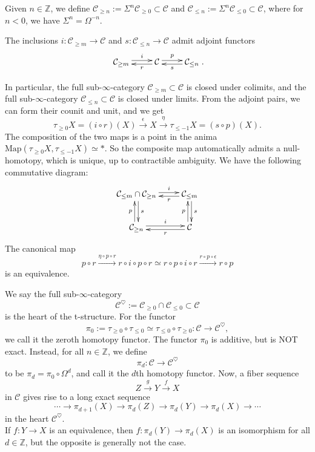\documentclass[UTF8,12,a4paper]{ctexart}
\theoremstyle{definition}
\begin{document}
Given $n\in \mathbb{Z}$, we define $\mathcal{C}_{\geq n}:= \Sigma^n \mathcal{C}_{\geq0}\subset \mathcal{C}$ and $\mathcal{C}_{\leq n}:=\Sigma^n \mathcal{C}_{\leq0}\subset \mathcal{C}$, where for $n<0$, we have $\Sigma^n=\Omega^{-n}.$

The inclusions $i:\mathcal{C}_{\geq m}\rightarrow \mathcal{C}$ and $s:\mathcal{C}_{\leq n}\rightarrow \mathcal{C}$ admit adjoint functors
$$
\xymatrix{\mathcal{C}_{\geq m} \ar@<0.5ex>[r]^-i
	&\mathcal{C}\ar@<0.5ex>[l]^-{r}
	 \ar@<0.5ex>[r]^-{p}
	& \mathcal{C}_{\leq n}\ar@<0.5ex>[l]^-s }.
$$





In particular, the full sub-$\infty$-category $\mathcal{C}_{\geq m}\subset \mathcal{C}$ is closed under colimits, and the full sub-$\infty$-category $\mathcal{C}_{\leq n}\subset \mathcal{C}$ is closed under limits. From the adjoint pairs, we can form their counit and unit, and we get
$$
\tau_{\geq 0}X=(i\circ r)(X)\stackrel{\epsilon}{\longrightarrow} X\stackrel{\eta}{\longrightarrow} \tau_{\leq -1}X=(s\circ p)(X).
$$
The composition of the two maps is a point in the anima $\text{Map}(\tau_{\geq 0}X,\tau_{\leq -1}X)\simeq *$. So the composite map automatically admits a null-homotopy, which is unique, up to contractible ambiguity. We have the following commutative diagram:
$$
\xymatrix{
\mathcal{C}_{\leq m}\cap \mathcal{C}_{\geq n}   
                    \ar@<0.5ex>[r]^-i     \ar@<0.5ex>[d]^-s
& \mathcal{C}_{\leq m}  \ar@<0.5ex>[l]^-r    \ar@<0.5ex>[d]^-s \\
\mathcal{C}_{\geq n} \ar@<0.5ex>[r]^-i     \ar@<0.5ex>[u]^-p  
& \mathcal{C}       \ar@<0.5ex>[l]^-r      \ar@<0.5ex>[u]^-p 
}
$$
The canonical map
$$
p\circ r\stackrel{\eta\circ p\circ r}{\longrightarrow}r\circ i\circ p\circ r\simeq r\circ p\circ i\circ r\stackrel{r\circ p\circ \epsilon}{\longrightarrow} r\circ p
$$
is an equivalence.


We say the full sub-$\infty$-category
$$
\mathcal{C}^{\heartsuit}:=\mathcal{C}_{\geq 0}\cap \mathcal{C}_{\leq 0}\subset \mathcal{C}
$$ 
is the heart of the t-structure. For the functor
 $$\pi_0:=\tau_{\geq 0}\circ\tau_{\leq 0}\simeq\tau_{\leq 0}\circ\tau_{\geq 0}:\mathcal{C}\rightarrow\mathcal{C}^{\heartsuit},$$
 we call it the zeroth homotopy functor. The functor $\pi_0$ is additive, but is NOT exact. Instead, for all $n\in \mathbb{Z}$, we define 
$$
\pi_d:\mathcal{C}\longrightarrow\mathcal{C}^{\heartsuit}
$$
to be $\pi_d=\pi_0\circ \Omega^d$, and call it the $d$th homotopy functor. Now, a fiber sequence
$$
Z\stackrel{g}\longrightarrow Y\stackrel{f}\longrightarrow X
$$
in $\mathcal{C}$ gives rise to a long exact sequence
$$
\cdots\longrightarrow\pi_{d+1}(X)\longrightarrow\pi_d (Z)\longrightarrow\pi_d (Y)\longrightarrow\pi_d (X)\longrightarrow\cdots
$$
in the heart $\mathcal{C}^{\heartsuit}$.\\
If $f:Y\to X$ is an equivalence, then $f:\pi_d(Y)\to \pi_d(X)$ is an isomorphism for all $d\in\mathbb{Z}$, but the opposite is generally not the case.
\end{document}

